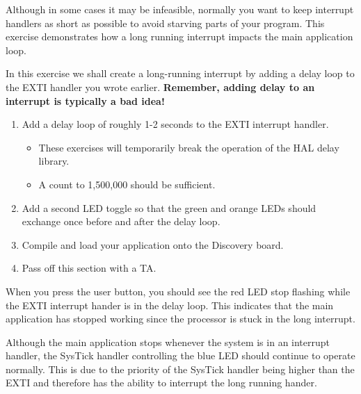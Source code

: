 \documentclass[11pt,fleqn]{book} %
\begin{document}
\begin{assignment}
    \label{ex6}
   Although in some cases it may be infeasible, normally you want to keep interrupt handlers as short as possible to avoid starving parts of your program. This exercise demonstrates how a long running interrupt impacts the main application loop. 

   In this exercise we shall create a long-running interrupt by adding a delay loop to the EXTI handler you wrote earlier. \textbf{Remember, adding delay to an interrupt is typically a bad idea!} 
   \begin{enumerate}
       \item Add a delay loop of roughly 1-2 seconds to the EXTI interrupt handler.
       \begin{itemize}
           \item These exercises will temporarily break the operation of the HAL delay library.
           \item A count to 1,500,000 should be sufficient. 
       \end{itemize} 
       \item Add a second LED toggle so that the green and orange LEDs should exchange once before and after the delay loop. 
       \item Compile and load your application onto the Discovery board.
       \item Pass off this section with a TA.
   \end{enumerate}
   
    \noindent When you press the user button, you should see the red LED stop flashing while the EXTI interrupt hander is in the delay loop. This indicates that the main application has stopped working since the processor is stuck in the long interrupt. 
    
   Although the main application stops whenever the system is in an interrupt handler, the SysTick handler controlling the blue LED should continue to operate normally. This is due to the priority of the SysTick handler being higher than the EXTI and therefore has the ability to interrupt the long running hander. 
\end{assignment}
  
\end{document}
